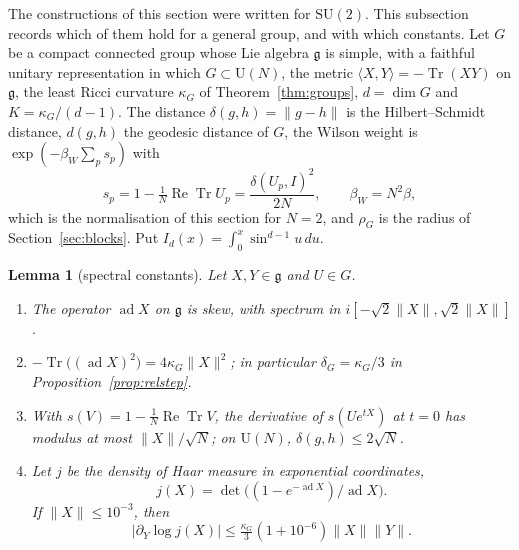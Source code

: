 \documentclass[11pt]{amsart}
\newtheorem{lemma}[theorem]{Lemma}
\theoremstyle{definition}
\theoremstyle{remark}
\numberwithin{equation}{section}
\newcommand{\SU}{\mathrm{SU}}
\newcommand{\U}{\mathrm{U}}
\newcommand{\g}{\mathfrak{g}}
\newcommand{\Tr}{\operatorname{Tr}}
\newcommand{\ReTr}{\operatorname{Re}\operatorname{Tr}}
\newcommand{\ip}[2]{\langle #1,#2\rangle}
\begin{document}
The constructions of this section were written for $\SU(2)$. This
subsection records which of them hold for a general group, and with which
constants. Let $G$ be a compact connected group whose Lie algebra $\g$ is
simple, with a faithful unitary representation in which $G\subset\U(N)$,
the metric $\ip XY=-\Tr(XY)$ on $\g$, the least Ricci curvature $\kappa_G$
of Theorem~\ref{thm:groups}, $d=\dim G$ and $K=\kappa_G/(d-1)$. The
distance $\delta(g,h)=\lVert g-h\rVert$ is the Hilbert--Schmidt distance,
$d(g,h)$ the geodesic distance of $G$, the Wilson weight is
$\exp(-\beta_W\sum_ps_p)$ with
\[
s_p=1-\tfrac1N\ReTr U_p=\frac{\delta(U_p,I)^2}{2N},\qquad\beta_W=N^2\beta,
\]
which is the normalisation of this section for $N=2$, and $\rho_G$ is the
radius of Section~\ref{sec:blocks}. Put $I_d(x)=\int_0^x\sin^{d-1}u\,du$.

\begin{lemma}[spectral constants]\label{lem:adspread}
Let $X,Y\in\g$ and $U\in G$.
\begin{enumerate}[label=\textup{(\roman*)},leftmargin=*]
\item The operator $\operatorname{ad}X$ on $\g$ is skew, with spectrum
in $i[-\sqrt2\lVert X\rVert,\sqrt2\lVert X\rVert]$.
\item $-\Tr\bigl((\operatorname{ad}X)^2\bigr)=4\kappa_G\lVert X\rVert^2$;
in particular $\delta_G=\kappa_G/3$ in Proposition~\ref{prop:relstep}.
\item With $s(V)=1-\frac1N\ReTr V$, the derivative of $s(Ue^{tX})$ at
$t=0$ has modulus at most $\lVert X\rVert/\sqrt N$; on $\U(N)$,
$\delta(g,h)\le2\sqrt N$.
\item Let $j$ be the density of Haar measure in exponential coordinates,
\[
j(X)=\det\bigl((1-e^{-\operatorname{ad}X})/\operatorname{ad}X\bigr).
\]
If $\lVert X\rVert\le10^{-3}$, then
\[
\lvert\partial_Y\log j(X)\rvert\le\tfrac{\kappa_G}3(1+10^{-6})\lVert X
\rVert\lVert Y\rVert .
\]
\end{enumerate}
\end{lemma}
\end{document}
